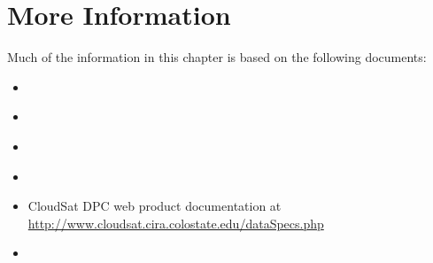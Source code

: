 \section{More Information}
Much of the information in this chapter is based on the following documents:

\begin{itemize}
\item \cite{HDF_EOS_UsersGuideVol1_2009}
\item \cite{HDF_42r4UsersGuide2009}
\item \cite{CALIPSO_Catalog2007}
\item \cite{CloudSatHandbook2008}
\item CloudSat DPC web product documentation
at \url{http://www.cloudsat.cira.colostate.edu/dataSpecs.php}
\item \cite{MODIS_Level1B_ProductUsersGuide2009}
\end{itemize}

